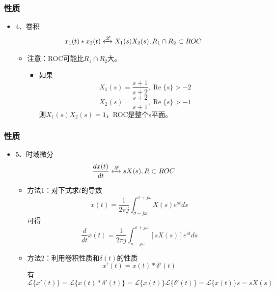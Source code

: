 \documentclass[CJKutf8,dvipsnames,table]{beamer}
\begin{document}
\begin{CJK*}{UTF8}{song}
  \begin{frame}
    \frametitle{性质}
    \begin{itemize}
    \item 4、卷积 \\
    \[
    x_1(t) \ast x_2(t) \xleftrightarrow{\mathscr{L}} X_1(s)X_2(s), R_1 \cap R_2 \subset ROC 
    \]
    	\begin{itemize}
   		\item 注意：ROC可能比$R_1 \cap R_2$大。
			\begin{itemize}
			\item 如果
			\[
			X_1(s)=\frac{s+1}{s+2}, \operatorname{Re}\{s\} > -2
			\]
			\[
			X_2(s)=\frac{s+2}{s+1}, \operatorname{Re}\{s\} > -1
			\]
			则$X_1(s)X_2(s)=1$，ROC是整个s平面。
			\end{itemize}
    	\end{itemize}
    \end{itemize}
  \end{frame}
   
  \begin{frame}
    \frametitle{性质}
    \begin{itemize}
    \item 5、时域微分 \\
    \[
    \frac{dx(t)}{dt} \xleftrightarrow{\mathscr{L}} sX(s), R \subset ROC 
    \]
    	\begin{itemize}
		\item 方法1：对下式求$t$的导数
		\[
				x(t) = \frac{1}{2\pi j}\int_{\sigma-j\omega}^{\sigma+j\omega} X(s)e^{st}ds 	
		\]
		可得
		\[
				\frac{d}{dt}x(t) = \frac{1}{2\pi j}\int_{\sigma-j\omega}^{\sigma+j\omega} [sX(s)]e^{st}ds 	
		\]
		\item 方法2：利用卷积性质和$\delta(t)$的性质
		\[
			x'(t) = x(t) \ast \delta'(t) %
		\]
		有
		\[
		\mathscr{L}\{x'(t)\} = \mathscr{L}\{x(t) \ast \delta'(t) \} = \mathscr{L}\{x(t)\} \mathscr{L}\{\delta'(t)\} = \mathscr{L}\{x(t)\}s = sX(s)
		\]
		\end{itemize}
    \end{itemize}
  \end{frame}


\end{CJK*}
\end{document}
